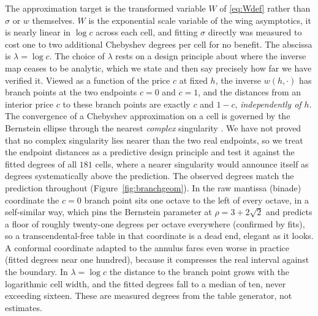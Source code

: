 \documentclass[11pt]{article}
\begin{document}
The approximation target is the transformed variable $W$ of \eqref{eq:Wdef} rather than $\sigma$ or $w$ themselves. $W$ is the exponential scale variable of the wing asymptotics, it is nearly linear in $\log c$ across each cell, and fitting $\sigma$ directly was measured to cost one to two additional Chebyshev degrees per cell for no benefit. The abscissa is $\lambda=\log c$. The choice of $\lambda$ rests on a design principle about where the inverse map ceases to be analytic, which we state and then say precisely how far we have verified it. Viewed as a function of the price $c$ at fixed $h$, the inverse $w(h,\cdot)$ has branch points at the two endpoints $c=0$ and $c=1$, and the distances from an interior price $c$ to these branch points are exactly $c$ and $1-c$, \emph{independently of $h$}. The convergence of a Chebyshev approximation on a cell is governed by the Bernstein ellipse through the nearest \emph{complex} singularity \citep{trefethen2019approximation,masonhandscomb2003}. We have not proved that no complex singularity lies nearer than the two real endpoints, so we treat the endpoint distances as a predictive design principle and test it against the fitted degrees of all $181$ cells, where a nearer singularity would announce itself as degrees systematically above the prediction. The observed degrees match the prediction throughout (Figure~\ref{fig:branchgeom}). In the raw mantissa (binade) coordinate the $c=0$ branch point sits one octave to the left of every octave, in a self-similar way, which pins the Bernstein parameter at $\rho=3+2\sqrt2$ and predicts a floor of roughly twenty-one degrees per octave everywhere (confirmed by fits), so a transcendental-free table in that coordinate is a dead end, elegant as it looks. A conformal coordinate adapted to the annulus fares even worse in practice (fitted degrees near one hundred), because it compresses the real interval against the boundary. In $\lambda=\log c$ the distance to the branch point grows with the logarithmic cell width, and the fitted degrees fall to a median of ten, never exceeding sixteen. These are measured degrees from the table generator, not estimates.
\end{document}
